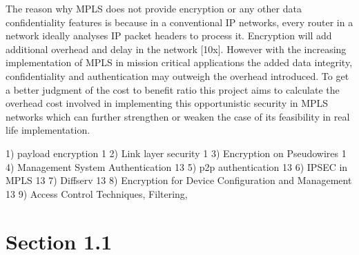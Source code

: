 The reason why MPLS does not provide encryption or any other data confidentiality features is because in a conventional IP networks, every router in a network ideally analyses IP packet headers to process it. Encryption will add additional overhead and delay in the network [10x]. However with the increasing implementation of MPLS in mission critical applications the added data integrity, confidentiality and authentication may outweigh the overhead introduced. To get a better judgment of the cost to benefit ratio this project aims to calculate the overhead cost involved in implementing this opportunistic security in MPLS networks which can further strengthen or weaken the case of its feasibility in real life implementation.




1) payload encryption 1
2) Link layer security 1
3) Encryption on Pseudowires 1
4) Management System Authentication 13
5) p2p authentication 13
6) IPSEC in MPLS 13
7) Diffserv 13
8) Encryption for Device Configuration and Management 13
9) Access Control Techniques, Filtering, 
	\section{Section 1.1}

